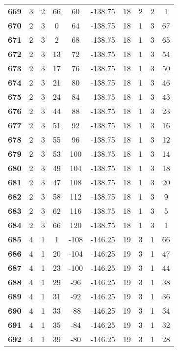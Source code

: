 \documentclass{article}%
\begin{document}
\begin{longtable}{cccccccccc}
        \textbf{669} & 3 & 2 & 66 & 60 & -138.75 & 18 & 2 & 2 & 1 \\ 
        \textbf{670} & 2 & 3 & 0 & 64 & -138.75 & 18 & 1 & 3 & 67 \\ 
        \textbf{671} & 2 & 3 & 2 & 68 & -138.75 & 18 & 1 & 3 & 65 \\ 
        \textbf{672} & 2 & 3 & 13 & 72 & -138.75 & 18 & 1 & 3 & 54 \\ 
        \textbf{673} & 2 & 3 & 17 & 76 & -138.75 & 18 & 1 & 3 & 50 \\ 
        \textbf{674} & 2 & 3 & 21 & 80 & -138.75 & 18 & 1 & 3 & 46 \\ 
        \textbf{675} & 2 & 3 & 24 & 84 & -138.75 & 18 & 1 & 3 & 43 \\ 
        \textbf{676} & 2 & 3 & 44 & 88 & -138.75 & 18 & 1 & 3 & 23 \\ 
        \textbf{677} & 2 & 3 & 51 & 92 & -138.75 & 18 & 1 & 3 & 16 \\ 
        \textbf{678} & 2 & 3 & 55 & 96 & -138.75 & 18 & 1 & 3 & 12 \\ 
        \textbf{679} & 2 & 3 & 53 & 100 & -138.75 & 18 & 1 & 3 & 14 \\ 
        \textbf{680} & 2 & 3 & 49 & 104 & -138.75 & 18 & 1 & 3 & 18 \\ 
        \textbf{681} & 2 & 3 & 47 & 108 & -138.75 & 18 & 1 & 3 & 20 \\ 
        \textbf{682} & 2 & 3 & 58 & 112 & -138.75 & 18 & 1 & 3 & 9 \\ 
        \textbf{683} & 2 & 3 & 62 & 116 & -138.75 & 18 & 1 & 3 & 5 \\ 
        \textbf{684} & 2 & 3 & 66 & 120 & -138.75 & 18 & 1 & 3 & 1 \\ 
        \textbf{685} & 4 & 1 & 1 & -108 & -146.25 & 19 & 3 & 1 & 66 \\ 
        \textbf{686} & 4 & 1 & 20 & -104 & -146.25 & 19 & 3 & 1 & 47 \\ 
        \textbf{687} & 4 & 1 & 23 & -100 & -146.25 & 19 & 3 & 1 & 44 \\ 
        \textbf{688} & 4 & 1 & 29 & -96 & -146.25 & 19 & 3 & 1 & 38 \\ 
        \textbf{689} & 4 & 1 & 31 & -92 & -146.25 & 19 & 3 & 1 & 36 \\ 
        \textbf{690} & 4 & 1 & 33 & -88 & -146.25 & 19 & 3 & 1 & 34 \\ 
        \textbf{691} & 4 & 1 & 35 & -84 & -146.25 & 19 & 3 & 1 & 32 \\ 
        \textbf{692} & 4 & 1 & 39 & -80 & -146.25 & 19 & 3 & 1 & 28 \\ 

\end{longtable}
\end{document}
